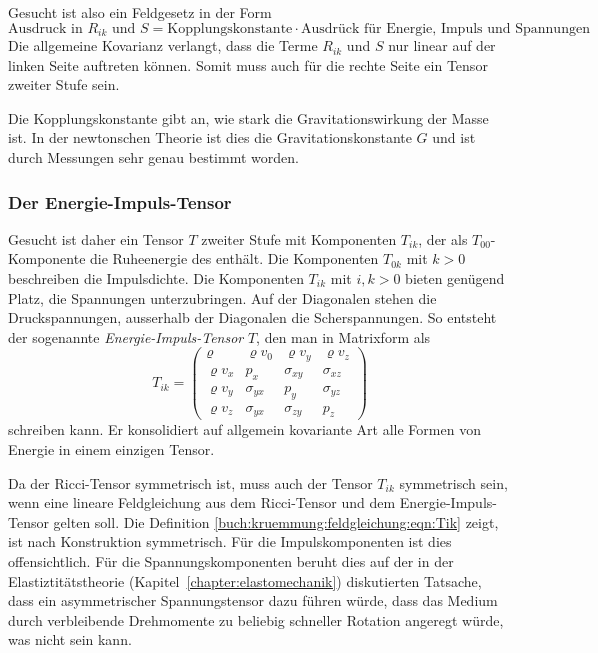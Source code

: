 Gesucht ist also ein Feldgesetz in der Form
\begin{equation}
\text{Ausdruck in $R_{ik}$ und $S$}
=
\text{Kopplungskonstante}
\cdot
\text{Ausdrück für Energie, Impuls und Spannungen}
\label{buch:kruemmung:feldgleichungen:eqn:schema}
\end{equation}
Die allgemeine Kovarianz verlangt, dass die Terme $R_{ik}$ und $S$
nur linear auf der linken Seite auftreten können.
Somit muss auch für die rechte Seite ein Tensor zweiter Stufe sein.

Die Kopplungskonstante gibt an, wie stark die Gravitationswirkung
der Masse ist. 
In der newtonschen Theorie ist dies die Gravitationskonstante $G$
und ist durch Messungen sehr genau bestimmt worden.

%
%
\subsubsection{Der Energie-Impuls-Tensor}
Gesucht ist daher ein Tensor $T$ zweiter Stufe mit Komponenten
$T_{ik}$, der als $T_{00}$-Komponente die Ruheenergie des enthält.
Die Komponenten $T_{0k}$ mit $k>0$ beschreiben die Impulsdichte.
Die Komponenten $T_{ik}$ mit $i,k>0$ bieten genügend Platz, die
Spannungen unterzubringen.
Auf der Diagonalen stehen die Druckspannungen, ausserhalb der Diagonalen
die Scherspannungen.
So entsteht der sogenannte \emph{Energie-Impuls-Tensor} $T$,
den man in Matrixform als
\begin{equation}
T_{ik}
=
\begin{pmatrix}
\varrho      & \varrho v_0 & \varrho v_y & \varrho v_z \\
\varrho v_x  & p_x         & \sigma_{xy} & \sigma_{xz} \\
\varrho v_y  & \sigma_{yx} & p_y         & \sigma_{yz} \\
\varrho v_z  & \sigma_{yx} & \sigma_{zy} & p_z
\end{pmatrix}
\label{buch:kruemmung:feldgleichung:eqn:Tik}
\end{equation}
schreiben kann.
Er konsolidiert auf allgemein kovariante Art alle Formen von Energie
in einem einzigen Tensor.

Da der Ricci-Tensor symmetrisch ist, muss auch der Tensor $T_{ik}$
symmetrisch sein, wenn eine lineare Feldgleichung aus dem Ricci-Tensor
und dem Energie-Impuls-Tensor gelten soll.
Die Definition \eqref{buch:kruemmung:feldgleichung:eqn:Tik} zeigt,
ist nach Konstruktion symmetrisch.
Für die Impulskomponenten ist dies offensichtlich.
Für die Spannungskomponenten beruht dies auf der in der
Elastiztitätstheorie (Kapitel~\ref{chapter:elastomechanik})
diskutierten Tatsache, dass ein asymmetrischer Spannungstensor dazu
führen würde, dass das Medium durch verbleibende Drehmomente zu
beliebig schneller Rotation angeregt würde, was nicht sein kann.


